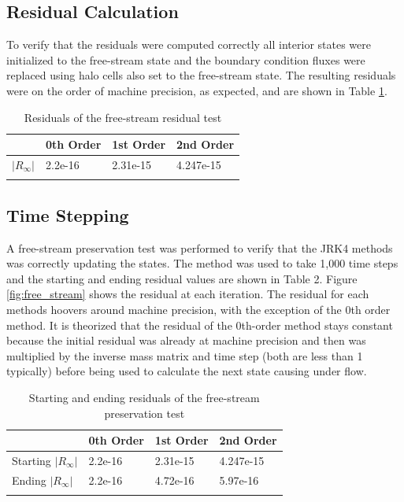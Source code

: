 \documentclass{article}
\begin{document}
\subsection{Residual Calculation}
To verify that the residuals were computed correctly all interior states were initialized to the free-stream state and the boundary condition fluxes were replaced using halo cells also set to the free-stream state.
The resulting residuals were on the order of machine precision, as expected, and are shown in Table \ref{tab:freestream}.


\begin{table}[H]
		\label{tab:freestream}
		\begin{tabular}{@{}llll@{}}
			\toprule
			& 0th Order& 1st Order & 2nd Order \\ \midrule
			$|R_{\infty}|$ & 2.2e-16  & 2.31e-15 & 4.247e-15  \\
			\bottomrule

		\caption{Residuals of the free-stream residual test}
		\end{tabular}
\end{table}

\subsection{Time Stepping}
A free-stream preservation test was performed to verify that the JRK4 methods was correctly updating the states.
The method was used to take 1,000 time steps and the starting and ending residual values are shown in Table 2.
Figure \ref{fig:free_stream} shows the residual at each iteration.
The residual for each methods hoovers around machine precision, with the exception of the 0th order method.
It is theorized that the residual of the 0th-order method stays constant because the initial residual was already at machine precision and then was multiplied by the inverse mass matrix and time step (both are less than 1 typically) before being used to calculate the next state causing under flow.

\begin{table}[H]
	\label{tab:fsp}
	\begin{tabular}{@{}llll@{}}
	\toprule
		& 0th Order& 1st Order & 2nd Order \\ \midrule
		Starting $|R_{\infty}|$ & 2.2e-16  & 2.31e-15 & 4.247e-15  \\
		Ending $|R_{\infty}|$ & 2.2e-16   & 4.72e-16 & 5.97e-16 \\
	\bottomrule
	\caption{Starting and ending residuals of the free-stream preservation test}

	\end{tabular}
\end{table}
\end{document}
